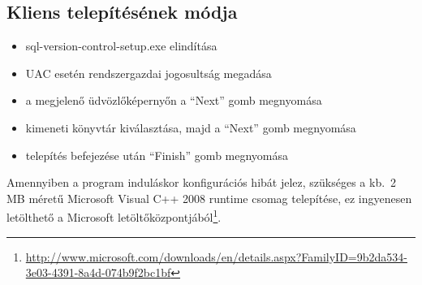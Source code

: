 \documentclass[a4paper,12pt]{article}
\begin{document}
\subsection{Kliens telepítésének módja}

\begin{itemize}
\item sql-version-control-setup.exe elindítása
\item UAC esetén rendszergazdai jogosultság megadása
\item a megjelenő üdvözlőképernyőn a ``Next'' gomb megnyomása
\item kimeneti könyvtár kiválasztása, majd a ``Next'' gomb megnyomása
\item telepítés befejezése után ``Finish'' gomb megnyomása
\end{itemize}

Amennyiben a program induláskor konfigurációs hibát jelez, szükséges a kb.\ 2 MB méretű
Microsoft Visual C++ 2008 runtime csomag telepítése, ez ingyenesen letölthető a Microsoft
letöltőközpontjából\footnote{
\url{http://www.microsoft.com/downloads/en/details.aspx?FamilyID=9b2da534-3e03-4391-8a4d-074b9f2bc1bf}}.
\end{document}
